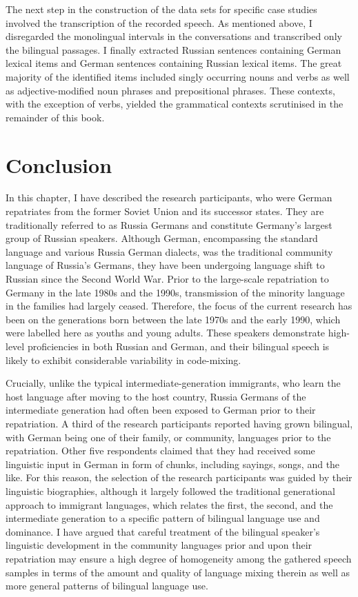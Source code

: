 The next step in the construction of the data sets for specific case studies involved the transcription of the recorded speech. As mentioned above, I disregarded the monolingual intervals in the conversations and transcribed only the bilingual passages. I finally extracted Russian sentences containing German lexical items and German sentences containing Russian lexical items. The great majority of the identified items included singly occurring nouns and verbs as well as adjective-modified noun phrases and prepositional phrases. These contexts, with the exception of verbs, yielded the grammatical contexts scrutinised in the remainder of this book. 

\section{Conclusion}
In this chapter, I have described the research participants, who were German repatriates from the former Soviet Union and its successor states. They are traditionally referred to as Russia Germans and constitute  Germany's largest group of Russian speakers. Although German, encompassing the standard language and various Russia German dialects, was the traditional community language of Russia's Germans, they have been undergoing language shift to Russian since the Second World War. Prior to the large-scale repatriation to Germany in the late 1980s and the 1990s, transmission of the minority language in the families had largely ceased. Therefore, the focus of the current research has been on the generations born between the late 1970s and the early 1990, which were labelled here as youths and young adults. These speakers demonstrate high-level proficiencies in both Russian and German, and their bilingual speech is likely to exhibit considerable variability in code-mixing. 

Crucially, unlike the typical intermediate-generation immigrants, who learn the host language after moving to the host country, Russia Germans of the intermediate generation had often been exposed to German prior to their repatriation. A third of the research participants reported having grown bilingual, with German being one of their family, or community, languages prior to the repatriation. Other five respondents claimed that they had received some linguistic input in German in form of chunks, including sayings, songs, and the like. For this reason, the selection of the research participants was guided by their linguistic biographies, although it largely followed the traditional generational approach to immigrant languages, which relates the first, the second, and the intermediate generation to a specific pattern of bilingual language use and dominance. I have argued that careful treatment of the bilingual speaker's linguistic development in the community languages prior and upon their repatriation may ensure a high degree of homogeneity among the gathered speech samples in terms of the amount and quality of language mixing therein as well as more general patterns of bilingual language use.

